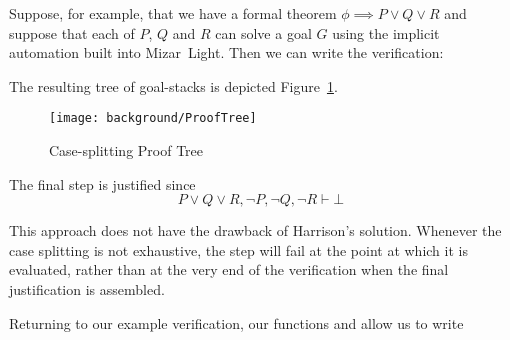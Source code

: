 Suppose, for example, that we have a formal theorem $\phi \implies P \vee Q \vee R$ and suppose that each of $P$, $Q$ and $R$ can solve a goal $G$ using the implicit automation built into Mizar~Light. Then we can write the verification:

\vspace{0.5cm}
\begin{minipage}{\linewidth}
  \footnotesize






\end{minipage}
\vspace{0.5cm}

The resulting tree of goal-stacks is depicted Figure~\ref{fig:CaseProofTree}.

\begin{figure}
\begin{center}
\texttt{[image: background/ProofTree]}
\end{center}
\caption{Case-splitting Proof Tree}
\label{fig:CaseProofTree}
\end{figure}

The final  step is justified since
\begin{displaymath}
P \vee Q \vee R, \neg P, \neg Q, \neg R \vdash \bot
\end{displaymath}

This approach does not have the drawback of Harrison's solution. Whenever the case splitting is not exhaustive, the  step will fail at the point at which it is evaluated, rather than at the very end of the verification when the final justification is assembled.

Returning to our example verification, our functions  and  allow us to write

\vspace{0.5cm}
\begin{minipage}{\linewidth}
  \footnotesize






\end{minipage}
\vspace{0.5cm}

